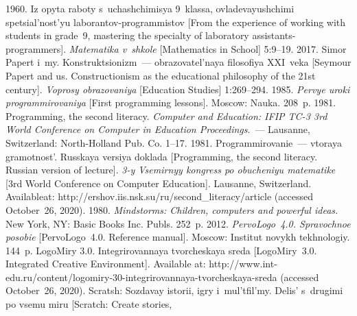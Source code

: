   \begin{multicols}{2}

\renewcommand{\bibname}{\protect\rmfamily References}

{\small\frenchspacing
 {%
 \begin{thebibliography}{99}

 1960. Iz opyta raboty s~uchashchimisya 9~klassa, ovladevayushchimi 
spetsial'nost'yu laborantov-programmistov [From the experience of working with students in grade~9, 
mastering the specialty of laboratory assistants-programmers]. \textit{Matematika v~shkole} 
[Mathematics in School] 5:9--19.
 2017. Simor Papert i~my. Konstruk\-tsio\-nizm~--- obrazovatel'naya filosofiya 
XXI~veka [Seymour Papert and us. Constructionism as the educational philosophy of the 21st century]. 
\textit{Voprosy obrazovaniya} [Education Studies] 1:269--294. 
 1985. \textit{Pervye uroki programmirovaniya} 
[First programming lessons]. Moscow: Nauka. 208~p.
 1981. Programming, the second literacy. 
\textit{Computer and Education: IFIP TC-3 3rd World Conference on Computer 
in Education Proceedings}.~--- Lausanne, Switzerland: North-Holland Pub. Co. 1--17.
 1981. Programmirovanie~--- vtoraya gramotnost'. Russkaya versiya doklada
[Programming, the second 
literacy. Russian version of lecture].   
\textit{3-y Vsemirnyy kongress po obucheniyu matematike} [3rd World Conference on Computer Education].
Lausanne, Switzerland. Available\linebreak at: {\sf 
http://ershov.iis.nsk.su/ru/second\_literacy/article} (accessed October~26, 
2020). 
 1980. \textit{Mindstorms: Children, computers and powerful ideas.} New York, 
NY: Basic Books Inc. Publs. 252~p.
 2012. \textit{PervoLogo~4.0. 
Spravochnoe posobie} [PervoLogo~4.0. Reference manual]. Moscow: Institut novykh tekhnologiy. 
144~p.
LogoMiry 3.0. Integrirovannaya tvorcheskaya sreda [LogoMiry~3.0. Integrated Creative Environment]. Available at: {\sf  
 http://www.int-edu.ru/content/logomiry-30-integrirovannaya-tvorcheskaya-sreda} (accessed 
October~26, 2020).
Scratsh: Sozdavay istorii, igry i~mul'tfil'my. Delis' s~drugimi po vsemu miru [Scratch: Create stories, 

\end{thebibliography}}}
\end{multicols}
